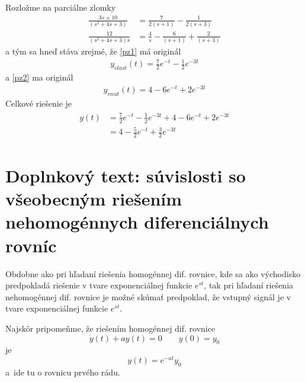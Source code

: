 \documentclass[a4paper, 10pt, ]{article}
\begin{document}
Rozložme na parciálne zlomky
\begin{align}
    \frac{3s + 10}{\left( s^2   + 4s  + 3\right)} &= \frac{7}{2(s+1)} - \frac{1}{2(s+3)} \label{pz1} \\
    \frac{12}{\left( s^2   + 4s  + 3\right) s} &= \frac{4}{s} - \frac{6}{(s+1)} + \frac{2}{(s+3)} \label{pz2}
\end{align}
a tým sa hneď stáva zrejmé, že \eqref{pz1} má originál
\begin{align}
    y_{vlast}(t) = \frac{7}{2} e^{-t} - \frac{1}{2} e^{-3t}
\end{align}
a \eqref{pz2} ma originál
\begin{align}
    y_{vnut}(t) = 4 - 6 e^{-t} + 2 e^{-3t}
\end{align}
Celkové riešenie je
\begin{align}
    \begin{aligned}
        y(t) &= \frac{7}{2} e^{-t} - \frac{1}{2} e^{-3t} +  4 - 6 e^{-t} + 2 e^{-3t} \\
        &= 4 - \frac{5}{2} e^{-t} + \frac{3}{2} e^{-3t}
    \end{aligned}
\end{align}
















\section[Doplnkový text: súvislosti so všeobecným riešením nehomogénnych diferenciálnych rovníc]{Doplnkový text: súvislosti so všeobecným riešením\\ nehomogénnych diferenciálnych rovníc}
\label{predchcasttato}

Obdobne ako pri hľadaní riešenia homogénnej dif. rovnice, kde sa ako východisko predpokladá riešenie v tvare exponenciálnej funkcie $e^{s t}$, tak pri hľadaní riešenia nehomogénnej dif. rovnice je možné skúmať predpoklad, že vstupný signál je v tvare exponenciálnej funkcie $e^{s t}$. 




Najskôr pripomeňme, že riešením homogénnej dif. rovnice 
\begin{equation}
    \dot y(t) + a y(t) = 0 \qquad y(0) = y_0
\end{equation}
je
\begin{equation}
    y(t) =  e^{-a t} y_0
\end{equation}
a~ide tu o rovnicu prvého rádu. 
\end{document}
